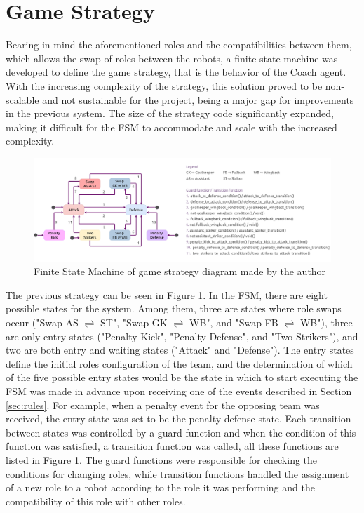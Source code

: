 \section{Game Strategy}

Bearing in mind the aforementioned roles and the compatibilities between them, which allows the swap of roles between the robots, a finite state machine was developed to define the game strategy, that is the behavior of the Coach agent. With the increasing complexity of the strategy, this solution proved to be non-scalable and not sustainable for the project, being a major gap for improvements in the previous system. The size of the strategy code significantly expanded, making it difficult for the FSM to accommodate and scale with the increased complexity.

\begin{figure}[!h]
    \centering
    \includegraphics[width=\linewidth]{chapters/target_system/images/BehaviorsController FSM.png}
    \caption{Finite State Machine of game strategy diagram made by the author}
    \label{fig:behaviors_controller_fsm}
\end{figure}

The previous strategy can be seen in Figure \ref{fig:behaviors_controller_fsm}. In the FSM, there are eight possible states for the system. Among them, three are states where role swaps occur ("Swap AS $\rightleftharpoons$ ST", "Swap GK $\rightleftharpoons$ WB", and "Swap FB $\rightleftharpoons$ WB"), three are only entry states ("Penalty Kick", "Penalty Defense", and "Two Strikers"), and two are both entry and waiting states ("Attack" and "Defense"). The entry states define the initial roles configuration of the team, and the determination of which of the five possible entry states would be the state in which to start executing the FSM was made in advance upon receiving one of the events described in Section \ref{sec:rules}. For example, when a penalty event for the opposing team was received, the entry state was set to be the penalty defense state. Each transition between states was controlled by a guard function and when the condition of this function was satisfied, a transition function was called, all these functions are listed in Figure \ref{fig:behaviors_controller_fsm}. The guard functions were responsible for checking the conditions for changing roles, while transition functions handled the assignment of a new role to a robot according to the role it was performing and the compatibility of this role with other roles.


